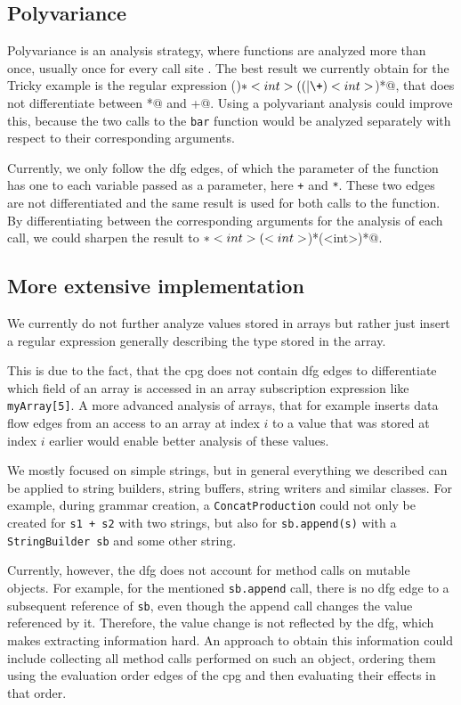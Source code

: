 \subsection{Polyvariance}\label{sec:futureWork:polyvariance}

Polyvariance is an analysis strategy, where functions are analyzed more than once, usually once for every call site \cite{polyvariance}. The best result we currently obtain for the Tricky example is the regular expression \Verb@(\()*<int>((\*|\+)<int>\))*@, that does not differentiate between \Verb@*@ and \Verb@+@. Using a polyvariant analysis could improve this, because the two calls to the \lstinline|bar| function would be analyzed separately with respect to their corresponding arguments. 

Currently, we only follow the \ac{dfg} edges, of which the parameter of the function has one to each variable passed as a parameter, here \lstinline|+| and \lstinline|*|. These two edges are not differentiated and the same result is used for both calls to the function.
By differentiating between the corresponding arguments for the analysis of each call, we could sharpen the result to \Verb@\(*<int>(\*<int>\))*(\+<int>\))*@.

\subsection{More extensive implementation}

We currently do not further analyze values stored in arrays but rather just insert a regular expression generally describing the type stored in the array.

This is due to the fact, that the \ac{cpg} does not contain \ac{dfg} edges to differentiate which field of an array is accessed in an array subscription expression like \lstinline|myArray[5]|.
A more advanced analysis of arrays, that for example inserts data flow edges from an access to an array at index $i$ to a value that was stored at index $i$ earlier would enable better analysis of these values.

We mostly focused on simple strings, but in general everything we described can be applied to string builders, string buffers, string writers and similar classes. For example, during grammar creation, a \lstinline|ConcatProduction| could not only be created for \lstinline|s1 + s2| with two strings, but also for \lstinline|sb.append(s)| with a \lstinline|StringBuilder sb| and some other string. 

Currently, however, the \ac{dfg} does not account for method calls on mutable objects. For example, for the mentioned \lstinline|sb.append| call, there is no \ac{dfg} edge to a subsequent reference of \lstinline|sb|, even though the append call changes the value referenced by it. Therefore, the value change is not reflected by the \ac{dfg}, which makes extracting information hard. An approach to obtain this information could include collecting all method calls performed on such an object, ordering them using the evaluation order edges of the \ac{cpg} and then evaluating their effects in that order.

